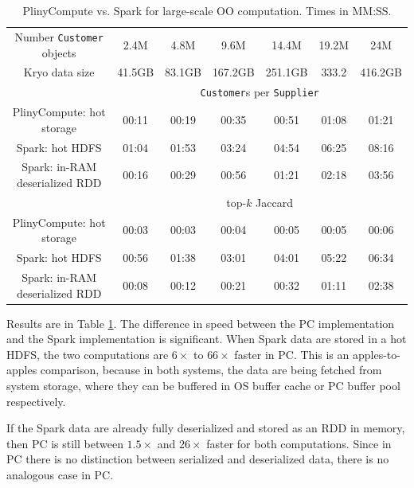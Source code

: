 \begin{table}[h!]
\begin{center}
\begin{tabular}{|c||c|c|c|c|c|c|}
\hline
Number \texttt{Customer} objects &2.4M & 4.8M & 9.6M  & 14.4M & 19.2M & 24M \\
Kryo data size &41.5GB & 83.1GB & 167.2GB &251.1GB &333.2 &416.2GB \\
\hline
& \multicolumn{6}{c|}{\texttt{Customer}s per \texttt{Supplier}} \\
\hline
PlinyCompute: hot storage & 00:11&	00:19&	00:35&	00:51&	01:08&	01:21 \\
Spark: hot HDFS & 01:04&	01:53&	03:24&	04:54&	06:25&	08:16\\
Spark: in-RAM deserialized RDD & 00:16& 	00:29& 	00:56& 	01:21& 	02:18& 	03:56\\
\hline
& \multicolumn{6}{c|}{top-$k$ Jaccard} \\
\hline
PlinyCompute: hot storage & 00:03&	00:03&	00:04&	00:05&	00:05&	00:06 \\
Spark: hot HDFS & 00:56&	01:38&	03:01 & 04:01&	05:22&	06:34\\
Spark: in-RAM deserialized RDD & 00:08& 	00:12& 	00:21 & 00:32& 	01:11& 	02:38\\
\hline
\end{tabular}
\caption{PlinyCompute vs. Spark for large-scale OO computation. Times in MM:SS.}
\label{fig:TPC}
\end{center}
\end{table}

Results are in Table \ref{fig:TPC}.  The difference in speed between the PC implementation and the Spark implementation
is significant.
When Spark data
are stored in
a hot HDFS, the two computations are $6\times$ to $66\times$ faster in PC.  
This is an apples-to-apples comparison, because in both systems, the data are being fetched from system storage, where they
can be buffered in OS buffer cache or PC buffer pool respectively.

If the Spark data are already
fully deserialized and stored as an RDD in memory, then PC is still 
between $1.5\times$ and $26\times$ faster
for both computations. Since in PC there is no distinction between
serialized and deserialized data, there is no analogous case in PC. 


